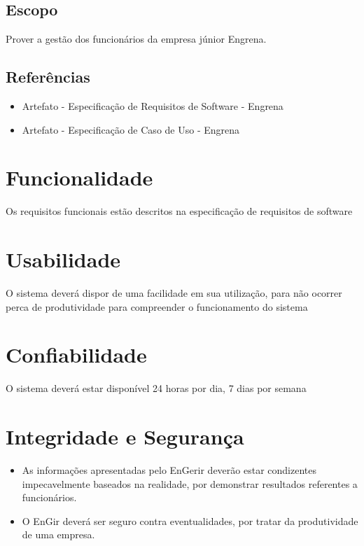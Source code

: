 \subsection{Escopo}

Prover a gestão dos funcionários da empresa júnior Engrena.

\subsection{Referências}

\begin{itemize}
\item{Artefato - Especificação de Requisitos de Software - Engrena}
\item{Artefato - Especificação de Caso de Uso - Engrena}
\end{itemize}

\section{Funcionalidade}

Os requisitos funcionais estão descritos na especificação de requisitos de software

\section{Usabilidade}

O sistema deverá dispor de uma facilidade em sua utilização, para não ocorrer perca de produtividade para compreender o funcionamento do sistema

\section{Confiabilidade}

O sistema deverá estar disponível 24 horas por dia, 7 dias por semana

\section{Integridade e Segurança}

\begin{itemize}
\item{As informações apresentadas pelo EnGerir deverão estar condizentes impecavelmente baseados na realidade, por demonstrar resultados referentes a funcionários.}
\item{O EnGir deverá ser seguro contra eventualidades, por tratar da produtividade de uma empresa.}
\end{itemize}

